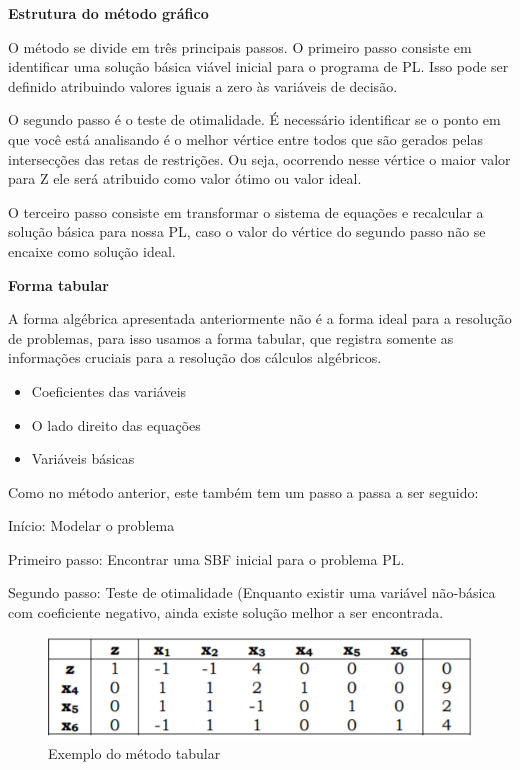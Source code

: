 \documentclass[
	12pt,				%
	openright,			%
	oneside,			%
	a4paper,			%
	english,			%
	french,				%
	spanish,			%
	brazil				%
	]{abntex2}
\begin{document}
\textbf{Estrutura do método gráfico}

O método se divide em três principais passos. O primeiro passo consiste em identificar uma solução básica viável inicial para o programa de PL. Isso pode ser definido atribuindo valores iguais a zero às variáveis de decisão. \cite{hillier2013introduccao}

O segundo passo é o teste de otimalidade. É necessário identificar se o ponto em que você está analisando é o melhor vértice entre todos que são gerados pelas intersecções das retas de restrições. Ou seja, ocorrendo nesse vértice o maior valor para Z ele será atribuido como valor ótimo ou valor ideal. \cite{hillier2013introduccao}

O terceiro passo  consiste em transformar o sistema de equações e recalcular a solução básica para nossa PL, caso o valor do vértice do segundo passo não se encaixe como solução ideal. \cite{hillier2013introduccao}

\textbf{Forma tabular}

A forma algébrica apresentada anteriormente não é a forma ideal para a resolução de problemas, para isso usamos a forma tabular, que registra somente as informações cruciais para a resolução dos cálculos algébricos. \cite{hillier2013introduccao}

\begin{itemize}
\item Coeficientes das variáveis
\item O lado direito das equações
\item Variáveis básicas
\end{itemize}	

Como no método anterior, este também tem um passo a passa a ser seguido:

Início: Modelar o problema

Primeiro passo: Encontrar uma SBF inicial para o problema PL.

Segundo passo: Teste de otimalidade (Enquanto existir uma variável não-básica com coeficiente negativo, ainda existe solução melhor a ser encontrada.

\begin{figure}[htb] \centering \label{figura1}
\caption{Exemplo do método tabular}
\includegraphics[scale=1]{imagens_suporte/tabela1.png}  
\end{figure}
\end{document}

